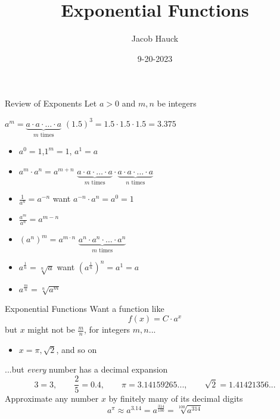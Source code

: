 \documentclass[]{beamer}
\title{Exponential Functions}
\author{Jacob Hauck}
\institute{Math 6010}
\date{9-20-2023}
\begin{document}
	\beamertemplatenavigationsymbolsempty
	
	\frame{\titlepage}
	
	\begin{frame}{Review of Exponents}
		Let $a > 0$ and $m, n$ be integers
		\vspace*{1em}
		
		$a^m = \underbrace{a \cdot a \cdot\ldots \cdot a}_{m \text{ times}}$ \pause \qquad $(1.5)^3 = 1.5 \cdot 1.5 \cdot 1.5 = 3.375$
		\vspace*{1em}
		\pause
		\begin{itemize}
			\item $a^0 = 1$,\quad $1^m = 1$, \quad $a^1 = a$
			\pause
			\vfill
			\item $a^m \cdot a^n = a^{m+n}$ \pause \qquad $\underbrace{a\cdot a\cdot\ldots\cdot a}_{m\text{ times}} \cdot \underbrace{a\cdot a\cdot\ldots\cdot a}_{n\text{ times}}$
			\vfill
			\pause
			\item $\frac{1}{a^n} = a^{-n}$ \pause \qquad want $a^{-n}\cdot a^n = a^0 = 1$
			\vfill
			\pause
			\item $\frac{a^m}{a^n} = a^{m-n}$
			\vfill
			\pause
			\item $\left(a^n\right)^m = a^{m\cdot n}$ \qquad $\underbrace{a^n \cdot a^n \cdot \ldots \cdot a^n}_{m\text{ times}}$
			\vfill
			\pause
			\item $a^\frac{1}{n} = \sqrt[n]{a}$ \qquad want $\left(a^\frac{1}{n}\right)^n = a^1 = a$
			\vfill
			\pause 
			\item $a^\frac{m}{n} = \sqrt[n]{a^m}$
		\end{itemize}
	\end{frame}

	\begin{frame}{Exponential Functions}
		Want a function like
		\begin{equation*}
			f(x) = C\cdot a^x
		\end{equation*}
		\pause
		but $x$ might not be $\frac{m}{n}$, for integers $m,n$...
		\pause\vfill
		\begin{itemize}
			\item $x = \pi, \sqrt{2}$, and so on
		\end{itemize}
		\pause
		\vfill
		...but \textit{every} number has a decimal expansion
		\begin{equation*}
			3 = 3, \qquad \frac{2}{5} = 0.4, \qquad \pi=3.14159265..., \qquad \sqrt{2} = 1.41421356...
		\end{equation*}
		\pause\vfill
		Approximate any number $x$ by finitely many of its decimal digits
		\begin{equation}
			a^\pi \approx a^{3.14} = a^{\frac{314}{100}} = \sqrt[100]{a^{314}}
		\end{equation}
	\end{frame}
\end{document}
